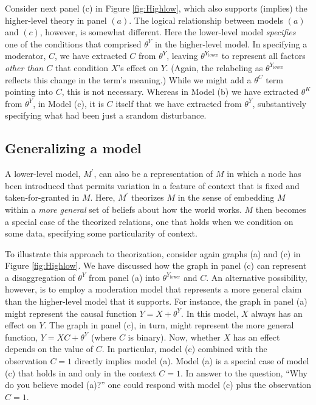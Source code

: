 \documentclass[12pt,]{book}
\begin{document}
Consider next panel (c) in Figure \ref{fig:Highlow}, which also supports (implies) the higher-level theory in panel \((a)\). The logical relationship between models \((a)\) and \((c)\), however, is somewhat different. Here the lower-level model \emph{specifies} one of the conditions that comprised \(\theta^Y\) in the higher-level model. In specifying a moderator, \(C\), we have extracted \(C\) from \(\theta^Y\), leaving \(\theta^{Y_\text{lower}}\) to represent all factors \emph{other than \(C\)} that condition \(X\)'s effect on \(Y\). (Again, the relabeling as \(\theta^{Y_\text{lower}}\) reflects this change in the term's meaning.) While we might add a \(\theta^C\) term pointing into \(C\), this is not necessary. Whereas in Model (b) we have extracted \(\theta^K\) from \(\theta^Y\), in Model (c), it is \(C\) itself that we have extracted from \(\theta^Y\), substantively specifying what had been just a srandom disturbance.

\hypertarget{generalizing-a-model}{%
\subsection{Generalizing a model}\label{generalizing-a-model}}

A lower-level model, \(M^\prime\), can also be a representation of \(M\) in which a node has been introduced that permits variation in a feature of context that is fixed and taken-for-granted in \(M\). Here, \(M^\prime\) theorizes \(M\) in the sense of embedding \(M\) within a \emph{more general} set of beliefs about how the world works. \(M\) then becomes a special case of the theorized relations, one that holds when we condition on some data, specifying some particularity of context.

To illustrate this approach to theorization, consider again graphs (a) and (c) in Figure \ref{fig:Highlow}. We have discussed how the graph in panel (c) can represent a disaggregation of \(\theta^Y\) from panel (a) into \(\theta^{Y_\text{lower}}\) and \(C\). An alternative possibility, however, is to employ a moderation model that represents a more general claim than the higher-level model that it supports. For instance, the graph in panel (a) might represent the causal function \(Y=X+\theta^Y\). In this model, \(X\) always has an effect on \(Y\). The graph in panel (c), in turn, might represent the more general function, \(Y=XC+\theta^Y\) (where \(C\) is binary). Now, whether \(X\) has an effect depends on the value of \(C\). In particular, model (c) combined with the observation \(C=1\) directly implies model (a). Model (a) is a special case of model (c) that holds in and only in the context \(C=1\). In answer to the question, ``Why do you believe model (a)?'' one could respond with model (c) plus the observation \(C=1\).
\end{document}
